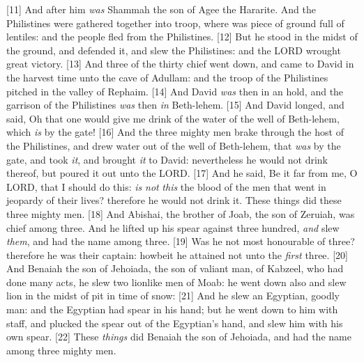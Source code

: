 [11] \textcolor[cmyk]{0.99998,1,0,0}{And after him \emph{was} Shammah the son of Agee the Hararite. And the Philistines were gathered together into troop, where was piece of ground full of lentiles: and the people fled from the Philistines.}
[12] \textcolor[cmyk]{0.99998,1,0,0}{But he stood in the midst of the ground, and defended it, and slew the Philistines: and the LORD wrought great victory.}
[13] \textcolor[cmyk]{0.99998,1,0,0}{And three of the thirty chief went down, and came to David in the harvest time unto the cave of Adullam: and the troop of the Philistines pitched in the valley of Rephaim.}
[14] \textcolor[cmyk]{0.99998,1,0,0}{And David \emph{was} then in an hold, and the garrison of the Philistines \emph{was} then \emph{in} Beth-lehem.}
[15] \textcolor[cmyk]{0.99998,1,0,0}{And David longed, and said, Oh that one would give me drink of the water of the well of Beth-lehem, which \emph{is} by the gate!}
[16] \textcolor[cmyk]{0.99998,1,0,0}{And the three mighty men brake through the host of the Philistines, and drew water out of the well of Beth-lehem, that \emph{was} by the gate, and took \emph{it}, and brought \emph{it} to David: nevertheless he would not drink thereof, but poured it out unto the LORD.}
[17] \textcolor[cmyk]{0.99998,1,0,0}{And he said, Be it far from me, O LORD, that I should do this: \emph{is} \emph{not} \emph{this} the blood of the men that went in jeopardy of their lives? therefore he would not drink it. These things did these three mighty men.}
[18] \textcolor[cmyk]{0.99998,1,0,0}{And Abishai, the brother of Joab, the son of Zeruiah, was chief among three. And he lifted up his spear against three hundred, \emph{and} slew \emph{them}, and had the name among three.}
[19] \textcolor[cmyk]{0.99998,1,0,0}{Was he not most honourable of three? therefore he was their captain: howbeit he attained not unto the \emph{first} three.}
[20] \textcolor[cmyk]{0.99998,1,0,0}{And Benaiah the son of Jehoiada, the son of valiant man, of Kabzeel, who had done many acts, he slew two lionlike men of Moab: he went down also and slew lion in the midst of pit in time of snow:}
[21] \textcolor[cmyk]{0.99998,1,0,0}{And he slew an Egyptian, goodly man: and the Egyptian had spear in his hand; but he went down to him with staff, and plucked the spear out of the Egyptian's hand, and slew him with his own spear.}
[22] \textcolor[cmyk]{0.99998,1,0,0}{These \emph{things} did Benaiah the son of Jehoiada, and had the name among three mighty men.}
